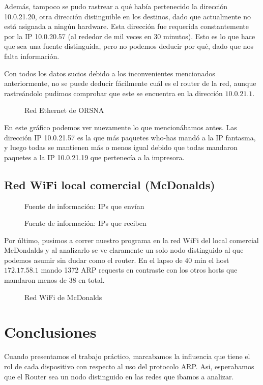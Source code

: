 \documentclass[a4paper, 11pt]{article}
\newcommand{\ponerGrafico}[4]
{\begin{figure}[H]
  \centering
  \subfloat{\hspace{-3.5cm}\texttt{[image: \#1]}}
  \caption{#2} \label{fig:#4}
\end{figure}
}
\begin{document}
Adem\'as, tampoco se pudo rastrear a qu\'e hab\'ia pertenecido la direcci\'on 10.0.21.20, otra direcci\'on distinguible en los destinos, dado que actualmente no est\'a asignada a ning\'un hardware. Esta direcci\'on fue requerida constantemente por la IP 10.0.20.57 (al rededor de mil veces en 30 minutos). Esto es lo que hace que sea una fuente distinguida, pero no podemos deducir por qu\'e, dado que nos falta informaci\'on.

Con todos los datos sucios debido a los inconvenientes mencionados anteriormente, no se puede deducir f\'acilmente  cu\'al es el router de la red, aunque rastre\'andolo pudimos comprobar que este se encuentra en la direcci\'on $10.0.21.1$.

\ponerGrafico{graficos/orsna_grafo.png}{Red Ethernet de ORSNA}{0.5}{label}

En este gr\'afico podemos ver nuevamente lo que mencion\'abamos antes. Las direcci\'on IP 10.0.21.57 es la que m\'as paquetes who-has mand\'o a la IP fantasma, y luego todas se mantienen m\'as o menos igual debido que todas mandaron paquetes a la IP 10.0.21.19 que pertenec\'ia a la impresora.

\subsection{Red WiFi local comercial (McDonalds)}
\ponerGrafico{graficos/mcdonalds_entropia.png}{Fuente de informaci\'on: IPs que env\'ian}{0.5}{label}
\ponerGrafico{graficos/mcdonalds_entropia_rcv.png}{Fuente de informaci\'on: IPs que reciben}{0.5}{label}

Por \'ultimo, pusimos a correr nuestro programa en la red WiFi del local comercial McDondalds y al analizarlo se ve claramente un solo nodo distinguido al que podemos asumir sin dudar como el router. En el lapso de 40 min el host $172.17.58.1$ mando 1372 ARP requests en contraste con los otros hosts que mandaron menos de 38 en total.  

\ponerGrafico{graficos/mcdonalds_grafo.png}{Red WiFi de McDonalds}{0.5}{label}

\section{Conclusiones}
Cuando presentamos el trabajo pr\'actico, marcabamos la influencia que tiene el rol de cada dispositivo con respecto al uso del protocolo ARP. Asi, esperabamos que el Router sea un nodo distinguido en las redes que ibamos a analizar.
\end{document}

